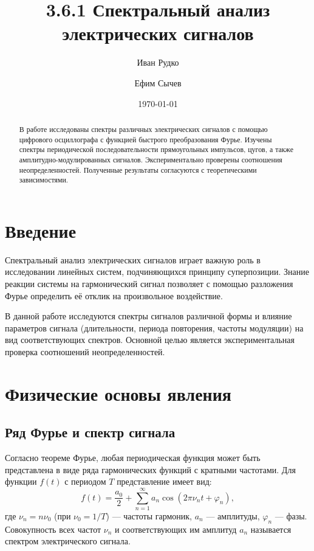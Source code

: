 \documentclass[reprint, amsmath, amssymb, aps, pra, nofootinbib]{revtex4-2}
\begin{document}
\title{3.6.1 Спектральный анализ электрических сигналов}

\author{Иван Рудко}

\author{Ефим Сычев}

\date{\today}

\begin{abstract}
В работе исследованы спектры различных электрических сигналов с помощью цифрового осциллографа с функцией быстрого преобразования Фурье. Изучены спектры периодической последовательности прямоугольных импульсов, цугов, а также амплитудно-модулированных сигналов. Экспериментально проверены соотношения неопределенностей. Полученные результаты согласуются с теоретическими зависимостями.
\end{abstract}

\maketitle

\section{Введение}
Спектральный анализ электрических сигналов играет важную роль в исследовании линейных систем, подчиняющихся принципу суперпозиции. Знание реакции системы на гармонический сигнал позволяет с помощью разложения Фурье определить её отклик на произвольное воздействие. 

В данной работе исследуются спектры сигналов различной формы и влияние параметров сигнала (длительности, периода повторения, частоты модуляции) на вид соответствующих спектров. Основной целью является экспериментальная проверка соотношений неопределенностей.

\section{Физические основы явления}

\subsection{Ряд Фурье и спектр сигнала}

Согласно теореме Фурье, любая периодическая функция может быть представлена в виде ряда гармонических функций с кратными частотами. Для функции $f(t)$ с периодом $T$ представление имеет вид:
\begin{equation}
f(t)=\frac{a_{0}}{2}+\sum_{n=1}^{\infty}a_{n}\cos(2\pi \nu_{n}t+\varphi_{n}),
\end{equation}
где $\nu_{n}=n\nu_{0}$ (при $\nu_{0}=1/T$) — частоты гармоник, $a_{n}$ — амплитуды, $\varphi_{n}$ — фазы. Совокупность всех частот $\nu_{n}$ и соответствующих им амплитуд $a_{n}$ называется спектром электрического сигнала.
\end{document}

